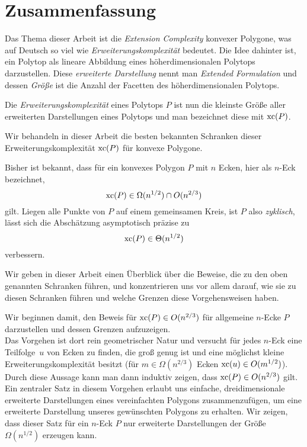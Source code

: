 \section*{Zusammenfassung}

Das Thema dieser Arbeit ist die \emph{Extension Complexity} konvexer Polygone, was auf Deutsch so viel wie \emph{Erweiterungskomplexität} bedeutet. Die Idee dahinter ist, ein Polytop als lineare Abbildung eines höherdimensionalen Polytops darzustellen. Diese \emph{erweiterte Darstellung} nennt man \emph{Extended Formulation} und dessen \emph{Größe} ist die Anzahl der Facetten des höherdimensionalen Polytops.

Die \emph{Erweiterungskomplexität} eines Polytops $P$ ist nun die kleinste Größe aller erweiterten Darstellungen eines Polytops und man bezeichnet diese mit $\operatorname{xc}(P)$.

Wir behandeln in dieser Arbeit die besten bekannten Schranken dieser Erweiterungskomplexität $\operatorname{xc}(P)$ für konvexe Polygone.

Bisher ist bekannt, dass für ein konvexes Polygon $P$ mit $n$ Ecken, hier als $n$-Eck bezeichnet, $$\operatorname{xc}(P) \in \Omega(n^{1/2}) \cap O(n^{2/3})$$ gilt. Liegen alle Punkte von $P$ auf einem gemeinsamen Kreis, ist $P$ also \emph{zyklisch}, lässt sich die Abschätzung asymptotisch präzise zu $$\operatorname{xc}(P) \in \Theta(n^{1/2})$$ verbessern.

Wir geben in dieser Arbeit einen Überblick über die Beweise, die zu den oben genannten Schranken führen, und konzentrieren uns vor allem darauf, wie sie zu diesen Schranken führen und welche Grenzen diese Vorgehensweisen haben.

Wir beginnen damit, den Beweis für $\operatorname{xc}(P) \in O(n^{2/3})$ für allgemeine $n$-Ecke $P$ darzustellen und dessen Grenzen aufzuzeigen.\\
Das Vorgehen ist dort rein geometrischer Natur und versucht für jedes $n$-Eck eine Teilfolge~$u$ von Ecken zu finden, die groß genug ist und eine möglichst kleine Erweiterungskomplexität besitzt (für $m \in \Omega(n^{2/3})$ Ecken $\operatorname{xc}(u) \in O(m^{1/2})$). Durch diese Aussage kann man dann induktiv zeigen, dass $\operatorname{xc}(P) \in O(n^{2/3})$ gilt.\\
Ein zentraler Satz in diesem Vorgehen erlaubt uns einfache, dreidimensionale erweiterte Darstellungen eines vereinfachten Polygons zusammenzufügen, um eine erweiterte Darstellung unseres gewünschten Polygons zu erhalten. Wir zeigen, dass dieser Satz für ein $n$-Eck $P$ nur erweiterte Darstellungen der Größe $\Omega(n^{1/2})$ erzeugen kann.

